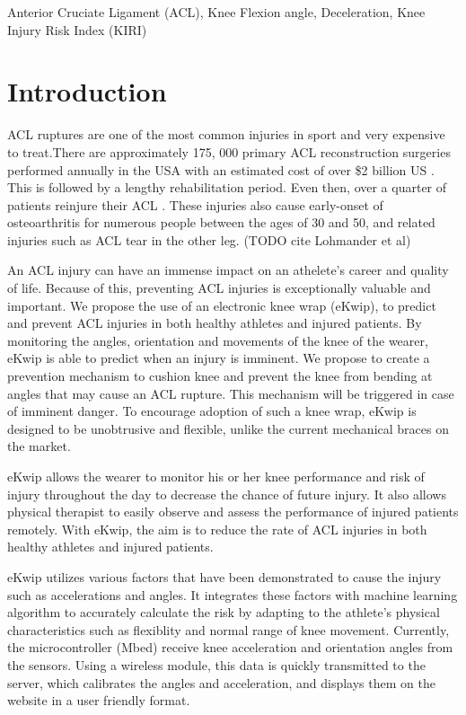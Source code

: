 \documentclass{sig-alternate}
\begin{document}
\begin{keywords}
	Anterior Cruciate Ligament (ACL),  Knee Flexion angle, Deceleration, Knee Injury Risk Index (KIRI)
\end{keywords}

\section{Introduction}
\label{sec:intro}
ACL ruptures are one of the most common injuries in sport and very expensive to treat.There are approximately 175, 000 primary ACL reconstruction surgeries performed annually in the USA with an estimated cost of over \$2 billion US \cite{yu2007mechanisms}. This is followed by a lengthy rehabilitation period. Even then, over a quarter of patients reinjure their ACL \cite{stevenson1998gender}. These injuries also cause early-onset of osteoarthritis for numerous people between the ages of 30 and 50, and related injuries such as ACL tear in the other leg. (TODO cite Lohmander et al)

An ACL injury can have an immense impact on an athelete's career and quality of life. Because of this, preventing ACL injuries is exceptionally valuable and important. We propose the use of an electronic knee wrap (eKwip), to predict and prevent ACL injuries in both healthy athletes and injured patients. By monitoring the angles, orientation and movements of the knee of the wearer, eKwip is able to predict when an injury is imminent. We propose to create a prevention mechanism to cushion knee and prevent the knee from bending at angles that may cause an ACL rupture. This mechanism will be triggered in case of imminent danger. To encourage adoption of such a knee wrap, eKwip is designed to be unobtrusive and flexible, unlike the current mechanical braces on the market.

eKwip allows the wearer to monitor his or her knee performance and risk of injury throughout the day to decrease the chance of future injury. It also allows physical therapist to easily observe and assess the performance of injured patients remotely. With eKwip, the aim is to reduce the rate of ACL injuries in both healthy athletes and injured patients.

eKwip utilizes various factors that have been demonstrated to cause the injury such as accelerations and angles. It integrates these factors with machine learning algorithm to accurately calculate the risk by adapting to the athlete's physical characteristics such as flexiblity and normal range of knee movement. Currently, the microcontroller (Mbed) receive knee acceleration and orientation angles from the sensors. Using a wireless module, this data is quickly transmitted to the server, which calibrates the angles and acceleration, and displays them on the website in a user friendly format.
\end{document}
